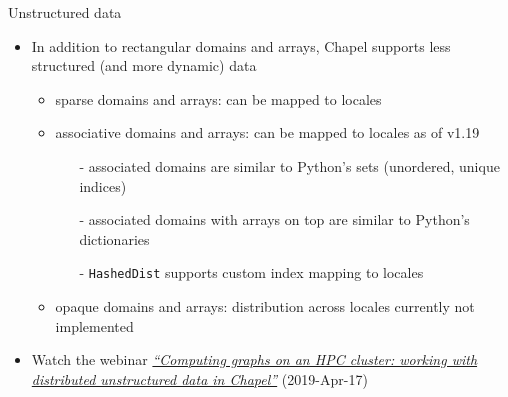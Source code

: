 \documentclass[10pt,xcolor=pdftex,dvipsnames,table]{beamer}
\newcommand{\tc}{\textcolor}
\begin{document}
\begin{frame}{Unstructured data}
  \begin{itemize}[]\setlength{\itemsep}{3mm}
  \item In addition to rectangular domains and arrays, Chapel supports less structured (and more dynamic) data
    \begin{itemize}[]\setlength{\itemsep}{1mm}
    \item sparse domains and arrays: can be mapped to locales
    \item associative domains and arrays: can be mapped to locales as of v1.19
      \begin{itemize}[]\setlength{\itemsep}{1mm}
      \item[-] associated domains are similar to Python's sets (unordered, unique indices)
      \item[-] associated domains with arrays on top are similar to Python's dictionaries
      \item[-] \texttt{HashedDist} supports custom index mapping to locales
      \end{itemize}
    \item opaque domains and arrays: distribution across locales currently not implemented
    \end{itemize}
  \item Watch the webinar
    \href{https://westgrid.github.io/trainingMaterials/programming/\#unstructured}{\tc{Mahogany}{\it
        ``Computing graphs on an HPC cluster: working with distributed unstructured data in Chapel''}}
        (2019-Apr-17)
  \end{itemize}
\end{frame}


\end{document}
